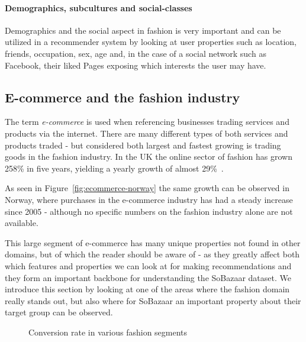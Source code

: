 \paragraph{Demographics, subcultures and social-classes}
Demographics and the social aspect in fashion is very important and can be
utilized in a recommender system by looking at user properties such as
location, friends, occupation, sex, age and, in the case of a social network
such as Facebook, their liked Pages exposing which interests the user may have.


\subsection{E-commerce and the fashion industry}
\label{sec:fashionInEcom}

The term \textit{e-commerce} is used when referencing businesses trading
services and products via the internet. There are many different types of both
services and products traded - but considered both largest and fastest growing
is trading goods in the fashion industry. In the UK the online sector of
fashion has grown 258\% in five years, yielding a yearly growth of almost
29\%~\cite{Divante2014}.

As seen in Figure~\ref{fig:ecommerce-norway} the same growth can be observed in
Norway, where purchases in the e-commerce industry has had a steady increase
since 2005 - although no specific numbers on the fashion industry alone are
not available.

This large segment of e-commerce has many unique properties not found in other
domains, but of which the reader should be aware of - as they greatly affect
both which features and properties we can look at for making recommendations
and they form an important backbone for understanding the SoBazaar dataset.
We introduce this section by looking at one of the areas where the fashion
domain really stands out, but also where for SoBazaar an important property
about their target group can be observed.

\begin{figure}[H]
    \centering
    \caption{Conversion rate in various fashion segments}
\end{figure}

